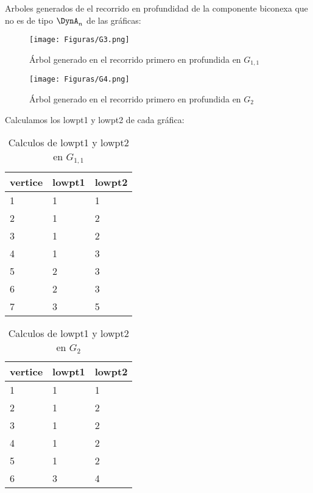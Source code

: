 Arboles generados de el recorrido en profundidad de la componente biconexa que no es de tipo $\DynA_{n}$ de las gráficas:
\begin{figure}[H]
\centering
\texttt{[image: Figuras/G3.png]}
\caption{Árbol generado en el recorrido primero en profundida en $G_{1, 1}$}
\label{figura:recorridoG1}
\end{figure}

\begin{figure}[H]
\centering
\texttt{[image: Figuras/G4.png]}
\caption{Árbol generado en el recorrido primero en profundida en $G_{2}$}
\label{figura:recorridoG2}
\end{figure}

Calculamos los lowpt1 y lowpt2 de cada gráfica:
\begin{table}[H]
\begin{center}
\begin{tabular}{lll}
\toprule
vertice & lowpt1 & lowpt2 \\
\midrule
      1 &      1 &      1 \\
      2 &      1 &      2 \\
      3 &      1 &      2 \\
      4 &      1 &      3 \\
      5 &      2 &      3 \\
      6 &      2 &      3 \\
      7 &      3 &      5 \\
\bottomrule
\end{tabular}
\caption{Calculos de lowpt1 y lowpt2 en $G_{1,1}$}
\end{center}
\end{table}


\begin{table}[H]
\begin{center}
\begin{tabular}{lll}
\toprule
vertice & lowpt1 & lowpt2 \\
\midrule
      1 &      1 &      1 \\
      2 &      1 &      2 \\
      3 &      1 &      2 \\
      4 &      1 &      2 \\
      5 &      1 &      2 \\
      6 &      3 &      4 \\
\bottomrule
\end{tabular}
\caption{Calculos de lowpt1 y lowpt2 en $G_{2}$}
\end{center}
\end{table}

